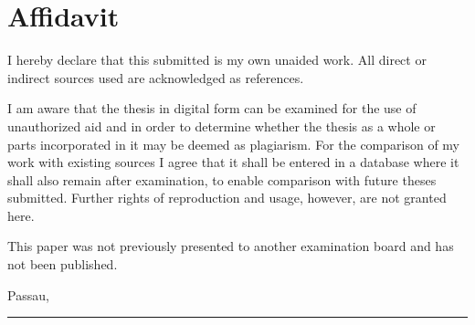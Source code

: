 
\chapter{Affidavit}

	
	I hereby declare that this \thesisType{} submitted is my own unaided work. All direct or indirect sources used are acknowledged as references. 
	
	I am aware that the thesis in digital form can be examined for the use of unauthorized aid and in order to determine whether the thesis as a whole or parts incorporated in it may be deemed as plagiarism. For the comparison of my work with existing sources I agree that it shall be entered in a database where it shall also remain after examination, to enable comparison with future theses submitted. Further rights of reproduction and usage, however, are not granted here. 
	
	This paper was not previously presented to another examination board and has not been published. 
	
	

	\vspace{3cm}

	Passau, \thedate

	\vspace{2cm}

	\parbox{8cm}{
		\hrule \strut \theauthor
	}

